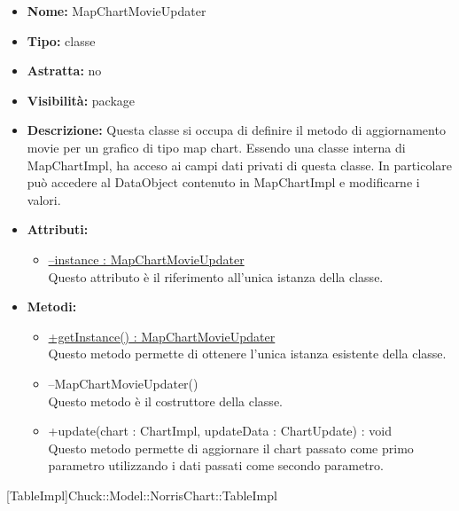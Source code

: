 			
			\begin{itemize}
			\item \textbf{Nome:} MapChartMovieUpdater
			\item \textbf{Tipo:} classe
			
		\item \textbf{Astratta:}
		no
			\item \textbf{Visibilità:} package
			\item \textbf{Descrizione:} Questa classe si occupa di definire il metodo di aggiornamento movie per un grafico di tipo map chart. Essendo una classe interna di MapChartImpl, ha acceso ai campi dati privati di questa classe. In particolare può accedere al DataObject contenuto in MapChartImpl e modificarne i valori.
			\item \textbf{Attributi:}
				\begin{itemize}
				\setlength{\itemsep}{5pt}
				
					\item[\ding{111}] \underline{--instance : MapChartMovieUpdater} \\ [1mm] Questo attributo è il riferimento all'unica istanza della classe.
				\end{itemize}
		
			\item \textbf{Metodi:}
				\begin{itemize}
				\setlength{\itemsep}{5pt}
				
					\item[\ding{111}] {\underline{+getInstance() : MapChartMovieUpdater}} \\ [1mm] Questo metodo permette di ottenere l'unica istanza esistente della classe.
					\item[\ding{111}] {{--MapChartMovieUpdater()}} \\ [1mm] Questo metodo è il costruttore della classe.
					\item[\ding{111}] {{+update(chart : ChartImpl, updateData : ChartUpdate) : void}} \\ [1mm] Questo metodo permette di aggiornare il chart passato come primo parametro utilizzando i dati passati come secondo parametro.
				\end{itemize}
		
			\end{itemize}

			
			[TableImpl]{Chuck::Model::NorrisChart::TableImpl}
			


